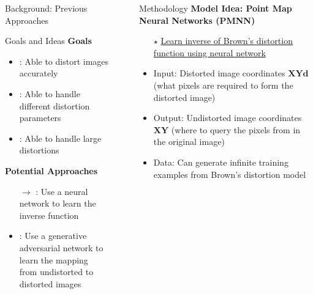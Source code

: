 \documentclass[final]{beamer}
\newlength{\sepwidth}
\newlength{\colwidth}
\newcommand{\separatorcolumn}{\begin{column}{\sepwidth}\end{column}}
\begin{document}
\begin{frame}[t]
\begin{columns}[t]
\begin{column}{\colwidth}
\begin{block}{Background: Previous Approaches}
      \end{block}

      \begin{block}{Goals and Ideas}
        \textbf{Goals}
        \begin{itemize}
          \item {}: Able to distort images accurately
          \item {}: Able to handle different distortion parameters
          \item {}: Able to handle large distortions
        \end{itemize}

        \textbf{Potential Approaches}
        \begin{itemize}
          \item[$\rightarrow$] : Use a neural network to learn the inverse function
          \item {}: Use a generative adversarial network to learn the mapping \\
                \makebox[7.25cm][l]{} from undistorted to distorted images
        \end{itemize}
      \end{block}



    \end{column}

    \separatorcolumn

    \begin{column}{\colwidth}

      \begin{block}{Methodology}
        \textbf{Model Idea: Point Map Neural Networks (PMNN)}
        \begin{itemize}
          \item[$\star$] \underline{Learn inverse of Brown's distortion function using neural network}
          \item Input: Distorted image coordinates $\mathbf{XYd}$ (what pixels are required to form the distorted image)
          \item Output: Undistorted image coordinates $\mathbf{XY}$ (where to query the pixels from in the original image)
          \item Data: Can generate infinite training examples from Brown's distortion model
        \end{itemize}
        \vspace{-1cm}


\end{block}
\end{column}
\end{columns}
\end{frame}
\end{document}
